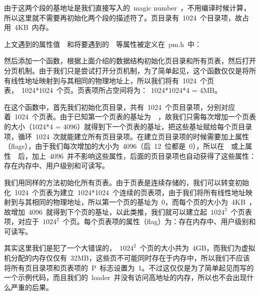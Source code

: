 由于这两个段的基地址是我们直接写入的~magic number~，不用编译时候计算，所以这里就不需要再初始化两个段的描述符了。页目录有~1024~个目录项，故占用~4KB~内存。

上文遇到的属性值~~和将要遇到的~~等属性被定义在~pm.h~中：


然后添加一个函数，根据上面介绍的数据结构初始化页目录和所有页表，然后打开分页机制。由于我们只是尝试打开分页机制，为了简单起见，这个函数仅仅是将所有线性地址映射到与其相同的物理地址上，所以我们将有~1024~个页表，~1024*1024~个页。页表项所占空间将为：~1024*1024*4 = 4MB。


在这个函数中，首先我们初始化页目录，共有~1024~个页目录项，分别对应着~1024~个页表。由于已知第一个页表的基址为~~，故我们只需每次增加一个页表的大小（1024*4 = 4096）就得到下一个页表的基址，把这些基址赋给每个页目录项，循环~1024~次就能建立所有页目录项。在建立页目录项的时候需要加上属性（flags），由于我们每次增加的大小为~4096（后~12~位都是~0），所以在~~或上属性~~后，加上~4096~并不影响这些属性，后面的页目录项也自动获得了这些属性：存在内存中、用户级别和可读写。

我们用同样的方法初始化所有页表。由于页表是连续存储的，我们可以转变初始化~1024~个页表为建立~1024*1024~个连续的页表项，由于我们将所有线性地址映射到与其相同的物理地址，所以第一个页的基址为~0，而每个页的大小为~4KB~，故增加~4096~就得到下个页的基址，以此类推，我们就可以建立起~$1024^2$~个页表项，对应于~$1024^2$~个页。每个页表项的属性（flag）为：存在内存中、用户级别和可读写。

其实这里我们是犯了一个大错误的，~$1024^2$~个页的大小共为~4GB，而我们为虚拟机分配的内存仅仅有~32MB，这些页不可能同时存在于内存中，所以我们不应该将所有页目录项和页表项的~P~标志设置为~1。不过这仅仅是为了简单起见而写的一个示例代码，而且我们的~loader~并没有访问高地址的内存，所以也不会出现什么严重的后果。

